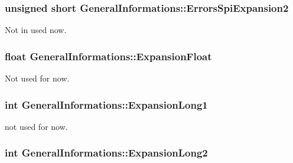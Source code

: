\subsubsection[{\texorpdfstring{Errors\+Spi\+Expansion2}{ErrorsSpiExpansion2}}]{\setlength{\rightskip}{0pt plus 5cm}unsigned short General\+Informations\+::\+Errors\+Spi\+Expansion2}\hypertarget{struct_general_informations_afcd202e8b7851289121ce9b5fd2b2dca}{}\label{struct_general_informations_afcd202e8b7851289121ce9b5fd2b2dca}


Not in used now. 

\subsubsection[{\texorpdfstring{Expansion\+Float}{ExpansionFloat}}]{\setlength{\rightskip}{0pt plus 5cm}float General\+Informations\+::\+Expansion\+Float}\hypertarget{struct_general_informations_a8641ff908d6f15eb4c3984515e369dde}{}\label{struct_general_informations_a8641ff908d6f15eb4c3984515e369dde}


Not used for now. 

\subsubsection[{\texorpdfstring{Expansion\+Long1}{ExpansionLong1}}]{\setlength{\rightskip}{0pt plus 5cm}int General\+Informations\+::\+Expansion\+Long1}\hypertarget{struct_general_informations_a4df94507a8b8f6bfdc84eedaf2d47f8f}{}\label{struct_general_informations_a4df94507a8b8f6bfdc84eedaf2d47f8f}


not used for now. 

\subsubsection[{\texorpdfstring{Expansion\+Long2}{ExpansionLong2}}]{\setlength{\rightskip}{0pt plus 5cm}int General\+Informations\+::\+Expansion\+Long2}\hypertarget{struct_general_informations_abc8962194d7c8b514be5c28d99b6b4a3}{}\label{struct_general_informations_abc8962194d7c8b514be5c28d99b6b4a3}


